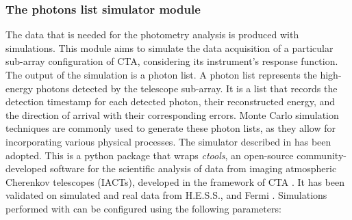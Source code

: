 \subsubsection{The photons list simulator module}
\label{ss:dl3-simulator}
The data that is needed for the photometry analysis is produced with simulations. This module aims to simulate the data acquisition of a particular sub-array configuration of CTA, considering its instrument's response function. The output of the simulation is a photon list. A photon list represents the high-energy photons detected by the telescope sub-array. It is a list that records the detection timestamp for each detected photon, their reconstructed energy, and the direction of arrival with their corresponding errors. Monte Carlo simulation techniques are commonly used to generate these photon lists, as they allow for incorporating various physical processes. The simulator described in \cite{dipiano2022ctasagsci} has been adopted. This is a python package that wraps \textit{ctools}, an open-source community-developed software  for the scientific analysis of data from imaging atmospheric Cherenkov telescopes (IACTs), developed in the framework of CTA \cite{Knodlseder_2016}. It has been validated on simulated and real data from H.E.S.S., and Fermi \cite{Knodlseder_2019}. 
Simulations performed with \cite{dipiano2022ctasagsci} can be configured using the following parameters: 
